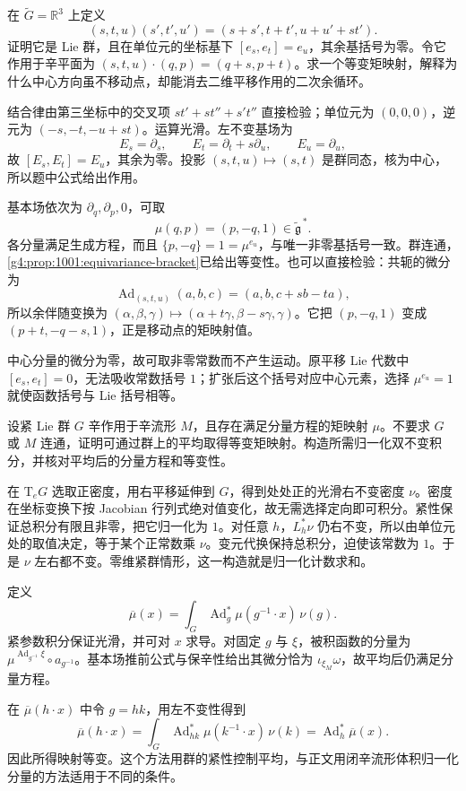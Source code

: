 \begin{exercise}\label{g4:ex:1001:central-extension}
	在 \(\widetilde G=\mathbb R^3\) 上定义
	\[
		(s,t,u)(s',t',u')=(s+s',t+t',u+u'+st').
	\]
	证明它是 Lie 群，且在单位元的坐标基下 \([e_s,e_t]=e_u\)，其余基括号为零。令它作用于辛平面为 \((s,t,u)\cdot(q,p)=(q+s,p+t)\)。求一个等变矩映射，解释为什么中心方向虽不移动点，却能消去二维平移作用的二次余循环。
\end{exercise}
\begin{solution}
	结合律由第三坐标中的交叉项 \(st'+st''+s't''\) 直接检验；单位元为 \((0,0,0)\)，逆元为 \((-s,-t,-u+st)\)。运算光滑。左不变基场为
	\[
		E_s=\partial_s,\qquad E_t=\partial_t+s\partial_u,
		\qquad E_u=\partial_u,
	\]
	故 \([E_s,E_t]=E_u\)，其余为零。投影 \((s,t,u)\mapsto(s,t)\) 是群同态，核为中心，所以题中公式给出作用。

	基本场依次为 \(\partial_q,\partial_p,0\)，可取
	\[
		\mu(q,p)=(p,-q,1)\in\widetilde{\mathfrak g}^{\,*}.
	\]
	各分量满足生成方程，而且 \(\{p,-q\}=1=\mu^{e_u}\)，与唯一非零基括号一致。群连通，\cref{g4:prop:1001:equivariance-bracket}已给出等变性。也可以直接检验：共轭的微分为
	\[
		\operatorname{Ad}_{(s,t,u)}(a,b,c)=(a,b,c+sb-ta),
	\]
	所以余伴随变换为 \((\alpha,\beta,\gamma)\mapsto(\alpha+t\gamma,\beta-s\gamma,\gamma)\)。它把 \((p,-q,1)\) 变成 \((p+t,-q-s,1)\)，正是移动点的矩映射值。

	中心分量的微分为零，故可取非零常数而不产生运动。原平移 Lie 代数中 \([e_s,e_t]=0\)，无法吸收常数括号 \(1\)；扩张后这个括号对应中心元素，选择 \(\mu^{e_u}=1\) 就使函数括号与 Lie 括号相等。
\end{solution}

\begin{exercise}\label{g4:ex:1001:compact-averaging}
	设紧 Lie 群 \(G\) 辛作用于辛流形 \(M\)，且存在满足分量方程的矩映射 \(\mu\)。不要求 \(G\) 或 \(M\) 连通，证明可通过群上的平均取得等变矩映射。构造所需归一化双不变积分，并核对平均后的分量方程和等变性。
\end{exercise}
\begin{solution}
	在 \(\mathrm{T}_eG\) 选取正密度，用右平移延伸到 \(G\)，得到处处正的光滑右不变密度 \(\nu\)。密度在坐标变换下按 Jacobian 行列式绝对值变化，故无需选择定向即可积分。紧性保证总积分有限且非零，把它归一化为 \(1\)。对任意 \(h\)，\(L_h^*\nu\) 仍右不变，所以由单位元处的取值决定，等于某个正常数乘 \(\nu\)。变元代换保持总积分，迫使该常数为 \(1\)。于是 \(\nu\) 左右都不变。零维紧群情形，这一构造就是归一化计数求和。

	定义
	\[
		\overline\mu(x)=\int_G\operatorname{Ad}_g^*\mu(g^{-1}\cdot x)\,\nu(g).
	\]
	紧参数积分保证光滑，并可对 \(x\) 求导。对固定 \(g\) 与 \(\xi\)，被积函数的分量为 \(\mu^{\operatorname{Ad}_{g^{-1}}\xi}\circ a_{g^{-1}}\)。基本场推前公式与保辛性给出其微分恰为 \(\iota_{\xi_M}\omega\)，故平均后仍满足分量方程。

	在 \(\overline\mu(h\cdot x)\) 中令 \(g=hk\)，用左不变性得到
	\[
		\overline\mu(h\cdot x)
		=\int_G\operatorname{Ad}_{hk}^*\mu(k^{-1}\cdot x)\,\nu(k)
		=\operatorname{Ad}_h^*\overline\mu(x).
	\]
	因此所得映射等变。这个方法用群的紧性控制平均，与正文用闭辛流形体积归一化分量的方法适用于不同的条件。
\end{solution}

